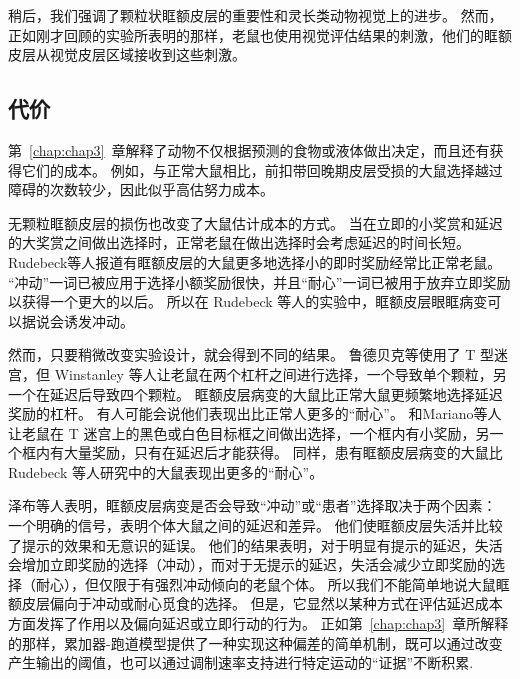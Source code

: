 稍后，我们强调了颗粒状眶额皮层的重要性和灵长类动物视觉上的进步。
然而，正如刚才回顾的实验所表明的那样，老鼠也使用视觉评估结果的刺激，他们的眶额皮层从视觉皮层区域接收到这些刺激。\par



\subsection{代价}

第~\ref{chap:chap3}~章解释了动物不仅根据预测的食物或液体做出决定，而且还有获得它们的成本。
例如，与正常大鼠相比，前扣带回晚期皮层受损的大鼠选择越过障碍的次数较少，因此似乎高估努力成本。\par


无颗粒眶额皮层的损伤也改变了大鼠估计成本的方式。
当在立即的小奖赏和延迟的大奖赏之间做出选择时，正常老鼠在做出选择时会考虑延迟的时间长短。
Rudebeck等人\cite{rudebeck2006separate}报道有眶额皮层的大鼠更多地选择小的即时奖励经常比正常老鼠。
“冲动”一词已被应用于选择小额奖励很快，并且“耐心”一词已被用于放弃立即奖励以获得一个更大的以后。
所以在 Rudebeck 等人的实验中，眶额皮层眼眶病变可以据说会诱发冲动。\par


然而，只要稍微改变实验设计，就会得到不同的结果。
鲁德贝克等使用了 T 型迷宫，但 Winstanley 等人\cite{winstanley2004contrasting}让老鼠在两个杠杆之间进行选择，一个导致单个颗粒，另一个在延迟后导致四个颗粒。
眶额皮层病变的大鼠比正常大鼠更频繁地选择延迟奖励的杠杆。
有人可能会说他们表现出比正常人更多的“耐心”。
和Mariano等人\cite{mariano2009impulsive}让老鼠在 T 迷宫上的黑色或白色目标框之间做出选择，一个框内有小奖励，另一个框内有大量奖励，只有在延迟后才能获得。
同样，患有眶额皮层病变的大鼠比 Rudebeck 等人研究中的大鼠表现出更多的“耐心”。\par


泽布等人\cite{zeeb2010contributions}表明，眶额皮层病变是否会导致“冲动”或“患者”选择取决于两个因素：
一个明确的信号，表明个体大鼠之间的延迟和差异。
他们使眶额皮层失活并比较了提示的效果和无意识的延误。
他们的结果表明，对于明显有提示的延迟，失活会增加立即奖励的选择（冲动），而对于无提示的延迟，失活会减少立即奖励的选择（耐心），但仅限于有强烈冲动倾向的老鼠个体。
所以我们不能简单地说大鼠眶额皮层偏向于冲动或耐心觅食的选择。
但是，它显然以某种方式在评估延迟成本方面发挥了作用以及偏向延迟或立即行动的行为。
正如第~\ref{chap:chap3}~章所解释的那样，累加器-跑道模型提供了一种实现这种偏差的简单机制，既可以通过改变产生输出的阈值，也可以通过调制速率支持进行特定运动的“证据”不断积累. \par


